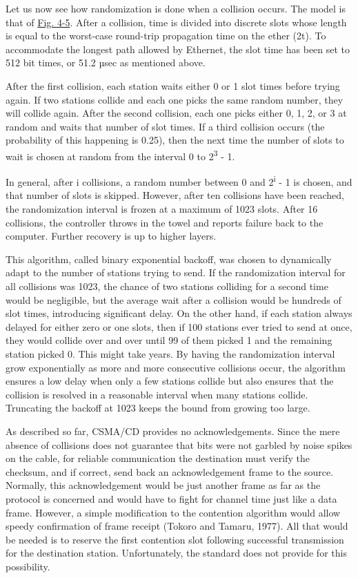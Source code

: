 Let us now see how randomization is done when a collision occurs. The
model is that of
\protect\hyperlink{0130661023_ch04lev1sec2.htmlux5cux23ch04fig05}{Fig.
4-5}. After a collision, time is divided into discrete slots whose
length is equal to the worst-case round-trip propagation time on the
ether (2{t}). To accommodate the longest path allowed by Ethernet, the
slot time has been set to 512 bit times, or 51.2 µsec as mentioned
above.

After the first collision, each station waits either 0 or 1 slot times
before trying again. If two stations collide and each one picks the same
random number, they will collide again. After the second collision, each
one picks either 0, 1, 2, or 3 at random and waits that number of slot
times. If a third collision occurs (the probability of this happening is
0.25), then the next time the number of slots to wait is chosen at
random from the interval 0 to 2\textsuperscript{3} - 1.

In general, after {i} collisions, a random number between 0 and
2{\textsuperscript{i}} - 1 is chosen, and that number of slots is
skipped. However, after ten collisions have been reached, the
randomization interval is frozen at a maximum of 1023 slots. After 16
collisions, the controller throws in the towel and reports failure back
to the computer. Further recovery is up to higher layers.

This algorithm, called {binary exponential backoff}, was chosen to
dynamically adapt to the number of stations trying to send. If the
randomization interval for all collisions was 1023, the chance of two
stations colliding for a second time would be negligible, but the
average wait after a collision would be hundreds of slot times,
introducing significant delay. On the other hand, if each station always
delayed for either zero or one slots, then if 100 stations ever tried to
send at once, they would collide over and over until 99 of them picked 1
and the remaining station picked 0. This might take years. By having the
randomization interval grow exponentially as more and more consecutive
collisions occur, the algorithm ensures a low delay when only a few
stations collide but also ensures that the collision is resolved in a
reasonable interval when many stations collide. Truncating the backoff
at 1023 keeps the bound from growing too large.

As described so far, CSMA/CD provides no acknowledgements. Since the
mere absence of collisions does not guarantee that bits were not garbled
by noise spikes on the cable, for reliable communication the destination
must verify the checksum, and if correct, send back an acknowledgement
frame to the source. Normally, this acknowledgement would be just
another frame as far as the protocol is concerned and would have to
fight for channel time just like a data frame. However, a simple
modification to the contention algorithm would allow speedy confirmation
of frame receipt (Tokoro and Tamaru, 1977). All that would be needed is
to reserve the first contention slot following successful transmission
for the destination station. Unfortunately, the standard does not
provide for this possibility.

